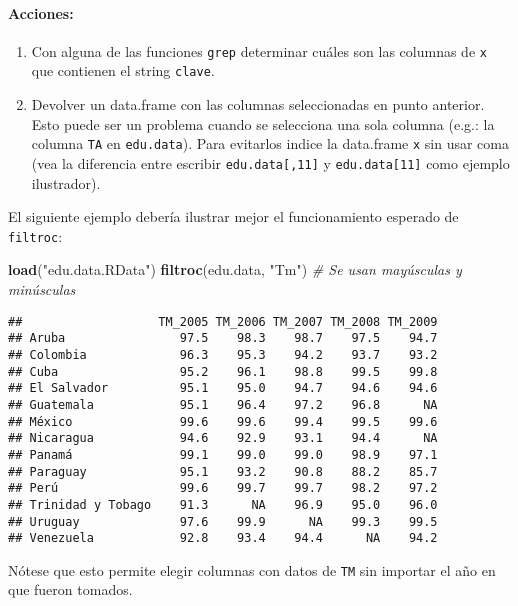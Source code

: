 \documentclass[]{article}
\newenvironment{Shaded}{}{}
\newcommand{\KeywordTok}[1]{\textcolor[rgb]{0.00,0.44,0.13}{\textbf{{#1}}}}
\newcommand{\StringTok}[1]{\textcolor[rgb]{0.25,0.44,0.63}{{#1}}}
\newcommand{\CommentTok}[1]{\textcolor[rgb]{0.38,0.63,0.69}{\textit{{#1}}}}
\newcommand{\NormalTok}[1]{{#1}}
\begin{document}
\paragraph{Acciones:}

\begin{enumerate}[1.]
\item
  Con alguna de las funciones \texttt{grep} determinar cuáles son las
  columnas de \texttt{x} que contienen el string \texttt{clave}.
\item
  Devolver un data.frame con las columnas seleccionadas en punto
  anterior. Esto puede ser un problema cuando se selecciona una sola
  columna (e.g.: la columna \texttt{TA} en \texttt{edu.data}). Para
  evitarlos indice la data.frame \texttt{x} sin usar coma (vea la
  diferencia entre escribir \texttt{edu.data{[},11{]}} y
  \texttt{edu.data{[}11{]}} como ejemplo ilustrador).
\end{enumerate}
El siguiente ejemplo debería ilustrar mejor el funcionamiento esperado
de \texttt{filtroc}:

\begin{Shaded}
\begin{Highlighting}[]
\KeywordTok{load}\NormalTok{(}\StringTok{"edu.data.RData"}\NormalTok{)}
\KeywordTok{filtroc}\NormalTok{(edu.data, }\StringTok{"Tm"}\NormalTok{)  }\CommentTok{# Se usan mayúsculas y minúsculas}
\end{Highlighting}
\end{Shaded}
\begin{verbatim}
##                   TM_2005 TM_2006 TM_2007 TM_2008 TM_2009
## Aruba                97.5    98.3    98.7    97.5    94.7
## Colombia             96.3    95.3    94.2    93.7    93.2
## Cuba                 95.2    96.1    98.8    99.5    99.8
## El Salvador          95.1    95.0    94.7    94.6    94.6
## Guatemala            95.1    96.4    97.2    96.8      NA
## México               99.6    99.6    99.4    99.5    99.6
## Nicaragua            94.6    92.9    93.1    94.4      NA
## Panamá               99.1    99.0    99.0    98.9    97.1
## Paraguay             95.1    93.2    90.8    88.2    85.7
## Perú                 99.6    99.7    99.7    98.2    97.2
## Trinidad y Tobago    91.3      NA    96.9    95.0    96.0
## Uruguay              97.6    99.9      NA    99.3    99.5
## Venezuela            92.8    93.4    94.4      NA    94.2
\end{verbatim}
Nótese que esto permite elegir columnas con datos de \texttt{TM} sin
importar el año en que fueron tomados.
\end{document}
